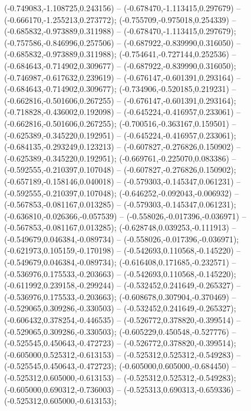  (-0.749083,-1.108725,0.243156) -- (-0.678470,-1.113415,0.297679) -- (-0.666170,-1.255213,0.273772);
 (-0.755709,-0.975018,0.254339) -- (-0.685832,-0.973889,0.311988) -- (-0.678470,-1.113415,0.297679);
 (-0.757586,-0.846996,0.257506) -- (-0.687922,-0.839990,0.316050) -- (-0.685832,-0.973889,0.311988);
 (-0.754641,-0.727144,0.252536) -- (-0.684643,-0.714902,0.309677) -- (-0.687922,-0.839990,0.316050);
 (-0.746987,-0.617632,0.239619) -- (-0.676147,-0.601391,0.293164) -- (-0.684643,-0.714902,0.309677);
 (-0.734906,-0.520185,0.219231) -- (-0.662816,-0.501606,0.267255) -- (-0.676147,-0.601391,0.293164);
 (-0.718828,-0.436002,0.192098) -- (-0.645224,-0.416957,0.233061) -- (-0.662816,-0.501606,0.267255);
 (-0.700516,-0.363167,0.159501) -- (-0.625389,-0.345220,0.192951) -- (-0.645224,-0.416957,0.233061);
 (-0.684135,-0.293249,0.123213) -- (-0.607827,-0.276826,0.150902) -- (-0.625389,-0.345220,0.192951);
 (-0.669761,-0.225070,0.083386) -- (-0.592555,-0.210397,0.107048) -- (-0.607827,-0.276826,0.150902);
 (-0.657189,-0.158146,0.040018) -- (-0.579303,-0.145347,0.061231) -- (-0.592555,-0.210397,0.107048);
 (-0.646252,-0.092043,-0.006932) -- (-0.567853,-0.081167,0.013285) -- (-0.579303,-0.145347,0.061231);
 (-0.636810,-0.026366,-0.057539) -- (-0.558026,-0.017396,-0.036971) -- (-0.567853,-0.081167,0.013285);
 (-0.628748,0.039253,-0.111913) -- (-0.549679,0.046384,-0.089734) -- (-0.558026,-0.017396,-0.036971);
 (-0.621973,0.105159,-0.170198) -- (-0.542693,0.110568,-0.145220) -- (-0.549679,0.046384,-0.089734);
 (-0.616408,0.171685,-0.232571) -- (-0.536976,0.175533,-0.203663) -- (-0.542693,0.110568,-0.145220);
 (-0.611992,0.239158,-0.299244) -- (-0.532452,0.241649,-0.265327) -- (-0.536976,0.175533,-0.203663);
 (-0.608678,0.307904,-0.370469) -- (-0.529065,0.309286,-0.330503) -- (-0.532452,0.241649,-0.265327);
 (-0.606432,0.378254,-0.446535) -- (-0.526772,0.378820,-0.399514) -- (-0.529065,0.309286,-0.330503);
 (-0.605229,0.450548,-0.527776) -- (-0.525545,0.450643,-0.472723) -- (-0.526772,0.378820,-0.399514);
 (-0.605000,0.525312,-0.613153) -- (-0.525312,0.525312,-0.549283) -- (-0.525545,0.450643,-0.472723);
 (-0.605000,0.605000,-0.684450) -- (-0.525312,0.605000,-0.613153) -- (-0.525312,0.525312,-0.549283);
 (-0.605000,0.690312,-0.736003) -- (-0.525313,0.690313,-0.659336) -- (-0.525312,0.605000,-0.613153);
